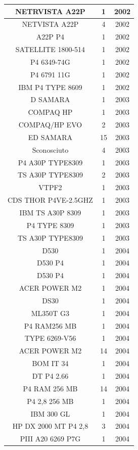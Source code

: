 \documentclass[12pt, a4paper, titlepage]{report}
\begin{document}
\begin{longtable}{| c | c | c |}
		NETRVISTA A22P & 1 & 2002 \\ \hline
		NETVISTA A22P & 4 & 2002 \\ \hline
		A22P P4 & 1 & 2002 \\ \hline
		SATELLITE 1800-514 & 1 & 2002 \\ \hline
		P4 6349-74G & 1 & 2002 \\ \hline
		P4 6791 11G & 1 & 2002 \\ \hline
		IBM P4 TYPE 8609 & 1 & 2002 \\ \hline
		D SAMARA & 1 & 2003 \\ \hline
		COMPAQ HP & 1 & 2003 \\ \hline
		COMPAQ/HP EVO & 2 & 2003 \\ \hline
		ED SAMARA & 15 & 2003 \\ \hline
		Sconosciuto & 4 & 2003 \\ \hline
		P4 A30P TYPE8309 & 1 & 2003 \\ \hline
		TS A30P TYPE8309 & 2 & 2003 \\ \hline
		VTPF2 & 1 & 2003 \\ \hline
		CDS THOR P4VE-2.5GHZ & 1 & 2003 \\ \hline
		IBM TS A30P 8309 & 1 & 2003 \\ \hline
		P4 TYPE 8309 & 1 & 2003 \\ \hline
		TS A30P TYPE8309 & 1 & 2003 \\ \hline
		D530 & 1 & 2004 \\ \hline
		D530 P4 & 1 & 2004 \\ \hline
		D530 P4 & 1 & 2004 \\ \hline
		ACER POWER M2 & 1 & 2004 \\ \hline
		DS30 & 1 & 2004 \\ \hline
		ML350T G3 & 1 & 2004 \\ \hline
		P4 RAM256 MB & 1 & 2004 \\ \hline
		TYPE 6269-V56 & 1 & 2004 \\ \hline
		ACER POWER M2 & 14 & 2004 \\ \hline
		BOM IT 34 & 1 & 2004 \\ \hline
		DT P4 2.66 & 1 & 2004 \\ \hline
		P4 RAM 256 MB & 14 & 2004 \\ \hline
		P4 2,8 256 MB & 1 & 2004 \\ \hline
		IBM 300 GL & 1 & 2004 \\ \hline
		HP DX 2000 MT P4 2,8 & 3 & 2004 \\ \hline
		PIII A20 6269 P7G & 1 & 2004 \\ \hline

\end{longtable}
\end{document}
